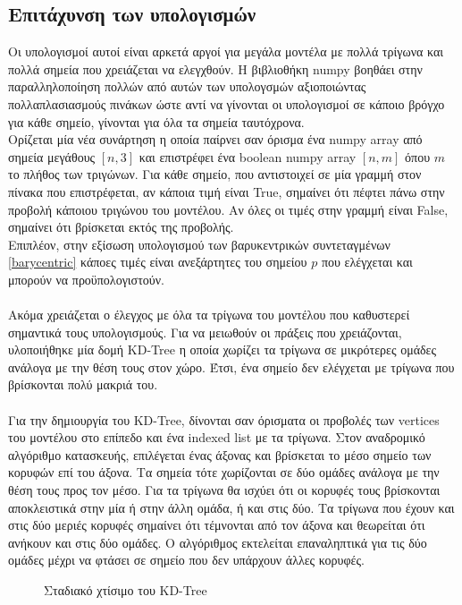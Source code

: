 \documentclass{report}
\begin{document}
\subsection{Επιτάχυνση των υπολογισμών} \label{sec:kdtree}
Οι υπολογισμοί αυτοί είναι αρκετά αργοί για μεγάλα μοντέλα με πολλά τρίγωνα και πολλά σημεία που χρειάζεται να ελεγχθούν.
Η βιβλιοθήκη numpy βοηθάει στην παραλληλοποίηση πολλών από αυτών των υπολογσμών αξιοποιώντας πολλαπλασιασμούς πινάκων ώστε
αντί να γίνονται οι υπολογισμοί σε κάποιο βρόγχο για κάθε σημείο, γίνονται για όλα τα σημεία ταυτόχρονα.\\
Ορίζεται μία νέα συνάρτηση η οποία παίρνει σαν όρισμα ένα numpy array από σημεία μεγάθους $\left[n, 3\right]$ και επιστρέφει
ένα boolean numpy array $\left[n, m\right]$ όπου $m$ το πλήθος των τριγώνων. Για κάθε σημείο, που αντιστοιχεί σε μία γραμμή στον πίνακα
που επιστρέφεται, αν κάποια τιμή είναι True, σημαίνει ότι πέφτει πάνω στην προβολή κάποιου τριγώνου του μοντέλου. Αν όλες οι τιμές στην γραμμή
είναι False, σημαίνει ότι βρίσκεται εκτός της προβολής.
\\
Επιπλέον, στην εξίσωση υπολογισμού των βαρυκεντρικών συντεταγμένων \eqref{barycentric} κάποες τιμές είναι ανεξάρτητες
του σημείου $p$ που ελέγχεται και μπορούν να προϋπολογιστούν.
\\\\
Ακόμα χρειάζεται ο έλεγχος με όλα τα τρίγωνα του μοντέλου που καθυστερεί σημαντικά τους υπολογισμούς. Για να μειωθούν οι πράξεις που
χρειάζονται, υλοποιήθηκε μία δομή KD-Tree η οποία χωρίζει τα τρίγωνα σε μικρότερες ομάδες ανάλογα με την θέση τους στον χώρο. Έτσι, ένα
σημείο δεν ελέγχεται με τρίγωνα που βρίσκονται πολύ μακριά του.
\\\\
Για την δημιουργία του KD-Tree, δίνονται σαν όρισματα οι προβολές των vertices του μοντέλου στο επίπεδο και ένα indexed list
με τα τρίγωνα. Στον αναδρομικό αλγόριθμο κατασκευής, επιλέγεται ένας άξονας και βρίσκεται το μέσο σημείο των κορυφών επί του άξονα.
Τα σημεία τότε χωρίζονται σε δύο ομάδες ανάλογα με την θέση τους προς τον μέσο. Για τα τρίγωνα θα ισχύει ότι οι κορυφές τους βρίσκονται
αποκλειστικά στην μία ή στην άλλη ομάδα, ή και στις δύο. Τα τρίγωνα που έχουν και στις δύο μεριές κορυφές σημαίνει ότι τέμνονται
από τον άξονα και θεωρείται ότι ανήκουν και στις δύο ομάδες. Ο αλγόριθμος εκτελείται επαναληπτικά για τις δύο ομάδες μέχρι να
φτάσει σε σημείο που δεν υπάρχουν άλλες κορυφές.

\begin{figure}[H] 
    \centering
    \captionsetup{font=small}
    \captionsetup{font=normal}
    \caption{Σταδιακό χτίσιμο του KD-Tree}
\end{figure}
\end{document}
